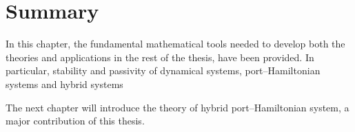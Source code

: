 \clearpage


\section{Summary}
%
In this chapter, the fundamental mathematical tools needed to develop both the theories and applications in the rest of the thesis, have been provided. In particular, stability and passivity of dynamical systems, port--Hamiltonian systems and hybrid systems
%
\newline

%
The next chapter will introduce the theory of hybrid port--Hamiltonian system, a major contribution of this thesis. 


